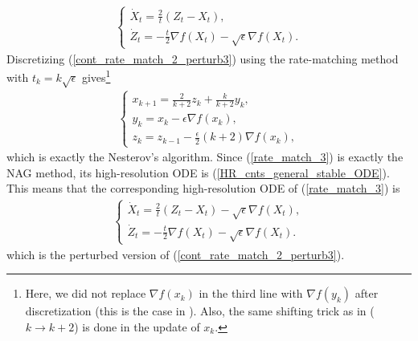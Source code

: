 \documentclass{article}
\theoremstyle{plain}
\theoremstyle{definition}
\theoremstyle{remark}
\begin{document}
\begin{align}\label{cont_rate_match_2_perturb3}
    \left\{\begin{array}{l}
         \dot X_t = \frac{2}{t}(Z_t-X_t),  \\
          \dot Z_t = -\frac{t}{2}\nabla f(X_t)-\sqrt{\epsilon}\nabla f(X_t).
    \end{array}
    \right.
\end{align}
Discretizing (\ref{cont_rate_match_2_perturb3}) using the rate-matching method with $t_k=k\sqrt{\epsilon}$ gives\footnote{Here, we did not replace $\nabla f(x_k)$ in the third line with $\nabla f(y_k)$ after discretization (this is the case in \cite{WibisonoE7351}). Also, the same shifting trick as in \cite{WibisonoE7351} ($k\rightarrow k+2$) is done in the update of $x_{k}$.}
\begin{align}\label{rate_match_3}
    \left\{\begin{array}{l}
    x_{k+1}=\frac{2}{k+2}z_k+\frac{k}{k+2}y_k,\\
    y_{k}=x_k-\epsilon\nabla f(x_k),   \\
    z_{k}=z_{k-1} -\frac{\epsilon}{2} (k+2)\nabla f(x_{k})  ,
    \end{array}\right.
\end{align}
which is exactly the Nesterov's algorithm. Since (\ref{rate_match_3}) is exactly the NAG method, its high-resolution ODE is (\ref{HR_cnts_general_stable_ODE}). This means that the corresponding high-resolution ODE of (\ref{rate_match_3}) is 
\begin{align}\label{cont_rate_match_2_perturb4}
    \left\{\begin{array}{l}
         \dot X_t = \frac{2}{t}(Z_t-X_t)-\sqrt{\epsilon}\nabla f(X_t),  \\
          \dot Z_t = -\frac{t}{2}\nabla f(X_t)-\sqrt{\epsilon}\nabla f(X_t).
    \end{array}
    \right.
\end{align}
which is the perturbed version of (\ref{cont_rate_match_2_perturb3}).
\end{document}
